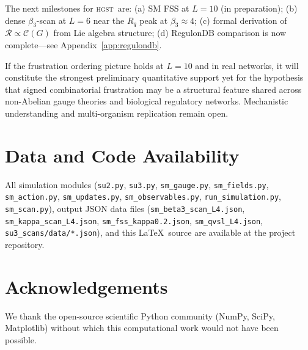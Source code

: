 \documentclass[12pt,a4paper]{article}
\newcommand{\R}{\mathcal{R}}           %
\newcommand{\hgst}{\textsc{hgst}}
\theoremstyle{plain}
\theoremstyle{definition}
\theoremstyle{remark}
\begin{document}
The next milestones for \hgst\ are:
(a) SM FSS at $L=10$ (in preparation);
(b) dense $\beta_3$-scan at $L=6$ near the $R_q$ peak at $\beta_3\approx4$;
(c) formal derivation of $\R\propto\mathcal{C}(G)$ from Lie algebra structure;
(d) RegulonDB comparison is now complete---see Appendix~\ref{app:regulondb}.

If the frustration ordering picture holds at $L=10$ and in real networks,
it will constitute the strongest preliminary quantitative support yet for
the hypothesis that signed combinatorial frustration may be a structural feature
shared across non-Abelian gauge theories and biological regulatory networks.
Mechanistic understanding and multi-organism replication remain open.

\section*{Data and Code Availability}

All simulation modules (\texttt{su2.py}, \texttt{su3.py}, \texttt{sm\_gauge.py},
\texttt{sm\_fields.py}, \texttt{sm\_action.py}, \texttt{sm\_updates.py},
\texttt{sm\_observables.py}, \texttt{run\_simulation.py}, \texttt{sm\_scan.py}),
output JSON data files (\texttt{sm\_beta3\_scan\_L4.json},
\texttt{sm\_kappa\_scan\_L4.json}, \texttt{sm\_fss\_kappa0.2.json},
\texttt{sm\_qvsl\_L4.json}, \texttt{su3\_scans/data/*.json}),
and this \LaTeX\ source are available at the project repository.

\section*{Acknowledgements}

We thank the open-source scientific Python community (NumPy, SciPy, Matplotlib) without
which this computational work would not have been possible.




\appendix
\end{document}
